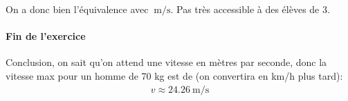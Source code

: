 On a donc bien l'équivalence avec $\SI{}{\meter\per\second}$. Pas très accessible à des élèves de 3\ieme{}.

\paragraph{Fin de l'exercice}
Conclusion, on sait qu'on attend une vitesse en mètres par seconde, donc la vitesse max pour un homme de 70 kg est de (on convertira en km/h plus tard):
\begin{gather*}
    \boxed{v \approx \SI{24.26}{\meter\per\second}}
\end{gather*}